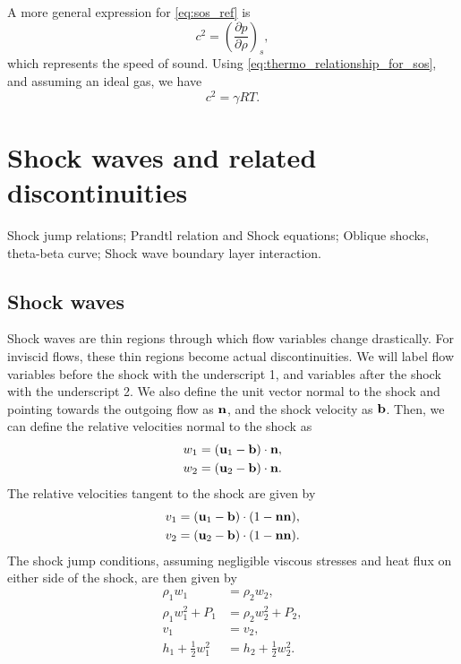 \documentclass[oneside,a4paper,11pt]{report}
\begin{document}
A more general expression for \cref{eq:sos_ref} is
\begin{equation}
    c^2 = \left( \frac{\partial p}{\partial \rho} \right)_s,
\end{equation}
which represents the speed of sound. Using \cref{eq:thermo_relationship_for_sos}, and assuming an ideal gas, we have
\begin{equation}
    c^2 = \gamma R T.
\end{equation}

%
\chapter{Shock waves and related discontinuities}
%
Shock jump relations; Prandtl relation and Shock equations; Oblique shocks, theta-beta curve; Shock wave boundary layer interaction.

\section{Shock waves}
\label{sec:shock_waves}
Shock waves are thin regions through which flow variables change drastically. For inviscid flows, these thin regions become actual discontinuities. We will label flow variables before the shock with the underscript 1, and variables after the shock with the underscript 2. We also define the unit vector normal to the shock and pointing towards the outgoing flow as $\mathbf{n}$, and the shock velocity as $\mathbf{b}$. Then, we can define the relative velocities normal to the shock as 
\begin{align}
\label{eq:shock_rel_vel_normal}
    w_1 &= (\mathbf{u}_1 - \mathbf{b}) \cdot \mathbf{n}, \nonumber \\
    w_2 &= (\mathbf{u}_2 - \mathbf{b}) \cdot \mathbf{n}.
\end{align}
The relative velocities tangent to the shock are given by
\begin{align}
\label{eq:shock_rel_vel_tangential}
    v_1 &= (\mathbf{u}_1 - \mathbf{b}) \cdot (1 - \mathbf{n} \mathbf{n}), \nonumber \\
    v_2 &= (\mathbf{u}_2 - \mathbf{b}) \cdot (1 - \mathbf{n} \mathbf{n}).
\end{align}
The shock jump conditions, assuming negligible viscous stresses and heat flux on either side of the shock, are then given by
\begin{align}
    \rho_1 w_1 &= \rho_2 w_2, \label{eq:shock_jump_mass}\\
    \rho_1 w_1^2 + P_1 &= \rho_2 w_2^2 + P_2, \label{eq:shock_jump_vel1}\\
    v_1 &= v_2, \label{eq:shock_jump_vel2} \\
    h_1 + \frac{1}{2} w_1^2 &= h_2 + \frac{1}{2} w_2^2 \label{eq:shock_jump_energy}.
\end{align}
\end{document}
